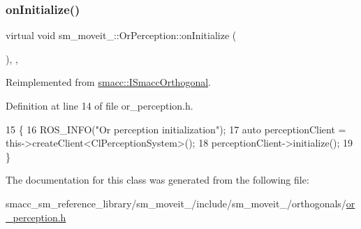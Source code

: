\subsubsection{\texorpdfstring{on\+Initialize()}{onInitialize()}}
{\footnotesize\ttfamily virtual void sm\+\_\+moveit\+\_\+::\+Or\+Perception\+::on\+Initialize (\begin{DoxyParamCaption}{ }\end{DoxyParamCaption})\hspace{0.3cm}{\ttfamily [inline]}, {\ttfamily [override]}, {\ttfamily [virtual]}}



Reimplemented from \hyperlink{classsmacc_1_1ISmaccOrthogonal_a6bb31c620cb64dd7b8417f8705c79c7a}{smacc\+::\+I\+Smacc\+Orthogonal}.



Definition at line 14 of file or\+\_\+perception.\+h.


\begin{DoxyCode}
15     \{
16         ROS\_INFO(\textcolor{stringliteral}{"Or perception initialization"});
17         \textcolor{keyword}{auto} perceptionClient = this->createClient<ClPerceptionSystem>();
18         perceptionClient->initialize();
19     \}
\end{DoxyCode}


The documentation for this class was generated from the following file\+:\begin{DoxyCompactItemize}
\item 
smacc\+\_\+sm\+\_\+reference\+\_\+library/sm\+\_\+moveit\+\_/include/sm\+\_\+moveit\+\_/orthogonals/\hyperlink{sm__moveit__4_2include_2sm__moveit__4_2orthogonals_2or__perception_8h}{or\+\_\+perception.\+h}\end{DoxyCompactItemize}
